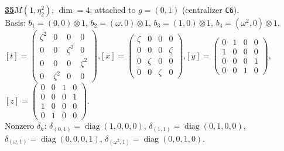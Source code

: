 \begin{samepage}\noindent\textbf{\underline{35}}\quad $M(1,\eta^{2}_{2})$, $\dim=4$; attached to $g=(0,1)$ (centralizer \texttt{C6}).\\
Basis: $b_{1}=(0,0)\otimes 1$, $b_{2}=(\omega,0)\otimes 1$, $b_{3}=(1,0)\otimes 1$, $b_{4}=(\omega^2,0)\otimes 1$.\\
$[t]=\left(\begin{smallmatrix} \zeta^2 & 0 & 0 & 0 \\ 0 & 0 & \zeta^2 & 0 \\ 0 & 0 & 0 & \zeta^2 \\ 0 & \zeta^2 & 0 & 0 \end{smallmatrix}\right)$,\quad $[x]=\left(\begin{smallmatrix} \zeta & 0 & 0 & 0 \\ 0 & 0 & 0 & \zeta \\ 0 & \zeta & 0 & 0 \\ 0 & 0 & \zeta & 0 \end{smallmatrix}\right)$,\quad $[y]=\left(\begin{smallmatrix} 0 & 1 & 0 & 0 \\ 1 & 0 & 0 & 0 \\ 0 & 0 & 0 & 1 \\ 0 & 0 & 1 & 0 \end{smallmatrix}\right)$,\quad $[z]=\left(\begin{smallmatrix} 0 & 0 & 1 & 0 \\ 0 & 0 & 0 & 1 \\ 1 & 0 & 0 & 0 \\ 0 & 1 & 0 & 0 \end{smallmatrix}\right)$.\\
Nonzero $\delta_h$: $\delta_{(0,1)}=\operatorname{diag}(1,0,0,0)$, $\delta_{(1,1)}=\operatorname{diag}(0,1,0,0)$, $\delta_{(\omega,1)}=\operatorname{diag}(0,0,0,1)$, $\delta_{(\omega^2,1)}=\operatorname{diag}(0,0,1,0)$.\end{samepage}
\medskip

